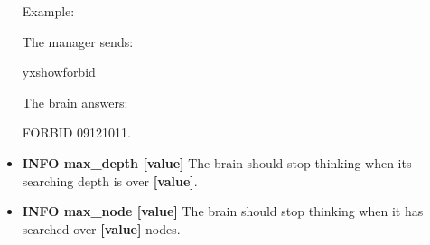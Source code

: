 \documentclass[a4paper,12pt]{article}
\begin{document}
\begin{itemize}
Example: 

The manager sends:

\fbox
{
yxshowforbid
}

The brain answers:

\fbox
{
FORBID 09121011.
}

\item \textbf{INFO max\_depth [value]}
The brain should stop thinking when its searching depth is over \textbf{[value]}.
\item \textbf{INFO max\_node [value]}
The brain should stop thinking when it has searched over \textbf{[value]} nodes. %

\end{itemize}



\end{document}
